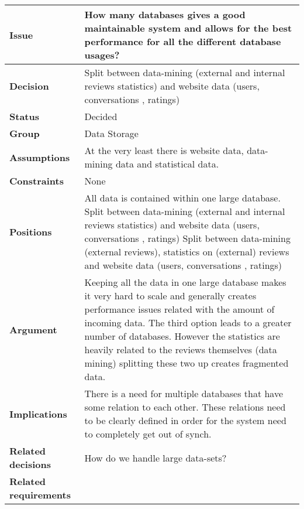 
\begin{tabular}{ l  p{10cm}}
\hline
\bf Issue & How many databases gives a good maintainable system and allows for the best performance for all the different database usages?\\
\hline
\bf Decision & Split between data-mining (external and internal reviews statistics) and website data (users, conversations , ratings)\\
\hline
\bf Status & Decided\\
\hline
\bf Group & Data Storage \\
\hline
\bf Assumptions & At the very least there is website data, data-mining data and statistical data.\\
\hline
\bf Constraints & None \\
\hline
\bf Positions & All data is contained within one large database. \newline\newline
Split between data-mining (external and internal reviews statistics) and website data (users, conversations , ratings)  \newline\newline
Split between data-mining (external reviews), statistics on (external) reviews and website data (users, conversations , ratings)
 \\
\hline
\bf Argument & Keeping all the data in one large database makes it very hard to scale and generally creates performance issues related with the amount of incoming data. 
The third option leads to a greater number of databases. However the statistics are heavily related to the reviews themselves (data mining) splitting these two up creates fragmented data. 
 \\
\hline
\bf Implications & There is a need for multiple databases that have some relation to each other. These relations need to be clearly defined in order for the system need to completely get out of synch. \\
\hline
\bf Related decisions & How do we handle large data-sets? \\
\hline
\bf Related requirements  & \\
\hline
\end{tabular}
